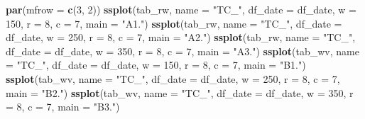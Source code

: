 \documentclass[]{elsarticle} %
\newenvironment{Shaded}{\begin{snugshade}}{\end{snugshade}}
\newcommand{\KeywordTok}[1]{\textcolor[rgb]{0.13,0.29,0.53}{\textbf{#1}}}
\newcommand{\DataTypeTok}[1]{\textcolor[rgb]{0.13,0.29,0.53}{#1}}
\newcommand{\DecValTok}[1]{\textcolor[rgb]{0.00,0.00,0.81}{#1}}
\newcommand{\StringTok}[1]{\textcolor[rgb]{0.31,0.60,0.02}{#1}}
\newcommand{\NormalTok}[1]{#1}
\begin{document}
\begin{Shaded}
\begin{Highlighting}[]
\KeywordTok{par}\NormalTok{(}\DataTypeTok{mfrow =} \KeywordTok{c}\NormalTok{(}\DecValTok{3}\NormalTok{, }\DecValTok{2}\NormalTok{))}
\KeywordTok{ssplot}\NormalTok{(tab_rw, }\DataTypeTok{name =} \StringTok{"TC_"}\NormalTok{, }\DataTypeTok{df_date =}\NormalTok{ df_date, }\DataTypeTok{w =} \DecValTok{150}\NormalTok{, }\DataTypeTok{r =} \DecValTok{8}\NormalTok{, }\DataTypeTok{c =} \DecValTok{7}\NormalTok{, }\DataTypeTok{main =} \StringTok{"A1."}\NormalTok{)}
\KeywordTok{ssplot}\NormalTok{(tab_rw, }\DataTypeTok{name =} \StringTok{"TC_"}\NormalTok{, }\DataTypeTok{df_date =}\NormalTok{ df_date, }\DataTypeTok{w =} \DecValTok{250}\NormalTok{, }\DataTypeTok{r =} \DecValTok{8}\NormalTok{, }\DataTypeTok{c =} \DecValTok{7}\NormalTok{, }\DataTypeTok{main =} \StringTok{"A2."}\NormalTok{)}
\KeywordTok{ssplot}\NormalTok{(tab_rw, }\DataTypeTok{name =} \StringTok{"TC_"}\NormalTok{, }\DataTypeTok{df_date =}\NormalTok{ df_date, }\DataTypeTok{w =} \DecValTok{350}\NormalTok{, }\DataTypeTok{r =} \DecValTok{8}\NormalTok{, }\DataTypeTok{c =} \DecValTok{7}\NormalTok{, }\DataTypeTok{main =} \StringTok{"A3."}\NormalTok{)}
\KeywordTok{ssplot}\NormalTok{(tab_wv, }\DataTypeTok{name =} \StringTok{"TC_"}\NormalTok{, }\DataTypeTok{df_date =}\NormalTok{ df_date, }\DataTypeTok{w =} \DecValTok{150}\NormalTok{, }\DataTypeTok{r =} \DecValTok{8}\NormalTok{, }\DataTypeTok{c =} \DecValTok{7}\NormalTok{, }\DataTypeTok{main =} \StringTok{"B1."}\NormalTok{)}
\KeywordTok{ssplot}\NormalTok{(tab_wv, }\DataTypeTok{name =} \StringTok{"TC_"}\NormalTok{, }\DataTypeTok{df_date =}\NormalTok{ df_date, }\DataTypeTok{w =} \DecValTok{250}\NormalTok{, }\DataTypeTok{r =} \DecValTok{8}\NormalTok{, }\DataTypeTok{c =} \DecValTok{7}\NormalTok{, }\DataTypeTok{main =} \StringTok{"B2."}\NormalTok{)}
\KeywordTok{ssplot}\NormalTok{(tab_wv, }\DataTypeTok{name =} \StringTok{"TC_"}\NormalTok{, }\DataTypeTok{df_date =}\NormalTok{ df_date, }\DataTypeTok{w =} \DecValTok{350}\NormalTok{, }\DataTypeTok{r =} \DecValTok{8}\NormalTok{, }\DataTypeTok{c =} \DecValTok{7}\NormalTok{, }\DataTypeTok{main =} \StringTok{"B3."}\NormalTok{)}
\end{Highlighting}
\end{Shaded}
\end{document}
